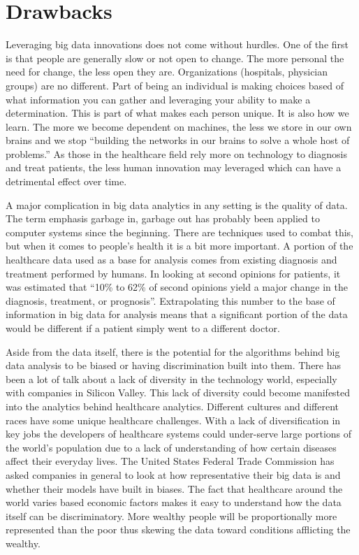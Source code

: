 \documentclass[sigconf]{acmart}
\begin{document}
\section{Drawbacks}
Leveraging big data innovations does not come without hurdles.  One 
of the first is that people are generally slow or not open to change.  
The more personal the need for change, the less open they are.  
Organizations (hospitals, physician groups) are no different.  Part of 
being an individual is making choices based of what information you can 
gather and leveraging your ability to make a determination.  This is 
part of what makes each person unique.  It is also how we learn.  The 
more we become dependent on machines, the less we store in our own 
brains and we stop ``building the networks in our brains to solve a 
whole host of problems.\cite{PsychologyToday}''  As those in the 
healthcare field rely more on technology to diagnosis and treat patients, 
the less human innovation may leveraged which can have a detrimental 
effect over time.  

A major complication in big data analytics in any setting is the quality 
of data.  The term emphasis garbage in, garbage out has probably been 
applied to computer systems since the beginning.  There are techniques 
used to combat this, but when it comes to people's health it is a bit 
more important.  A portion of the healthcare data used as a base for 
analysis comes from existing diagnosis and treatment performed by humans.  
In looking at second opinions for patients, it was estimated that 
``10\% to 62\% of second opinions yield a major change in the diagnosis, 
treatment, or prognosis''\cite{MayoClinic}.  Extrapolating this number 
to the base of information in big data for analysis means that a 
significant portion of the data would be different if a patient simply 
went to a different doctor.

Aside from the data itself, there is the potential for the algorithms 
behind big data analysis to be biased or having discrimination built 
into them.  There has been a lot of talk about a lack of diversity in 
the technology world, especially with companies in Silicon Valley.  
This lack of diversity could become manifested into the analytics behind 
healthcare analytics.  Different cultures and different races have some 
unique healthcare challenges.  With a lack of diversification in key 
jobs the developers of healthcare systems could under-serve large 
portions of the world's population due to a lack of understanding of 
how certain diseases affect their everyday lives.  The United States 
Federal Trade Commission has asked companies in general to look at 
how representative their big data is and whether their models have 
built in biases\cite{TheRegister}.  The fact that healthcare around 
the world varies based economic factors makes it easy to understand 
how the data itself can be discriminatory.  More wealthy people will 
be proportionally more represented than the poor thus skewing the data 
toward conditions afflicting the wealthy.  
\end{document}
